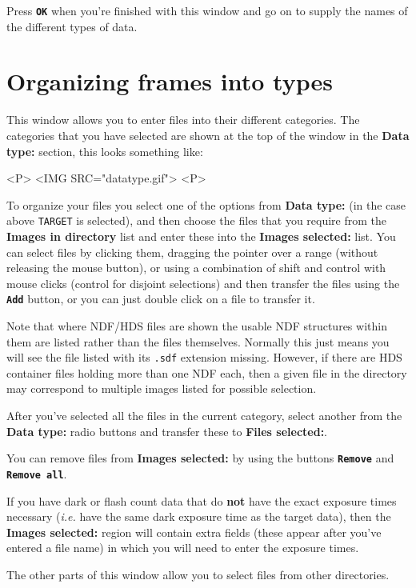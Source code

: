 \documentclass[11pt,nolof]{starlink}
\providecommand{\butt}[1]{{\bf \tt #1}}
\providecommand{\wlab}[1]{{\bf #1}}
\providecommand{\text}[1]{{\tt #1}}
\begin{document}
Press \butt{OK} when you're finished with this window and go on to
supply the names of the different types of data.

\section{Organizing frames into types }
This window allows you to enter files into their different categories.
The categories that you have selected are shown at the top of the
window in the \wlab{Data type:} section, this looks something like:
\begin{html}
<P>
<IMG SRC="datatype.gif">
<P>
\end{html}

To organize your files you select one of the options from
\wlab{Data type:} (in the case above \text{TARGET} is selected), and
then choose the files that you require from the
\wlab{Images in directory} list and enter these into the
\wlab{Images selected:} list.
You can select files by clicking them, dragging the pointer over
a range (without releasing the mouse button), or using a combination
of shift and control with mouse clicks (control for disjoint
selections) and then transfer the files using the \butt{Add} button,
or you can just double click on a file to transfer it.

Note that where NDF/HDS files are shown the usable NDF structures
within them are listed rather than the files themselves.
Normally this just means you will see the file listed
with its \text{.sdf} extension missing.  However, if there are HDS
container files holding more than one NDF each, then a given
file in the directory may correspond to multiple images listed
for possible selection.

After you've selected all the files in the current category, select
another from the \wlab{Data type:} radio buttons and transfer these to
\wlab{Files selected:}.

You can remove files from \wlab{Images selected:} by using the buttons
\butt{Remove} and \butt{Remove all}.

If you have dark or flash count data that do {\bf not} have the exact
exposure times necessary ({\em i.e.} have the same dark exposure time
as the target data), then the \wlab{Images selected:} region will contain
extra fields (these appear after you've entered a file name) in which
you will need to enter the exposure times.

The other parts of this window allow you to select files from other
directories.
\end{document}
